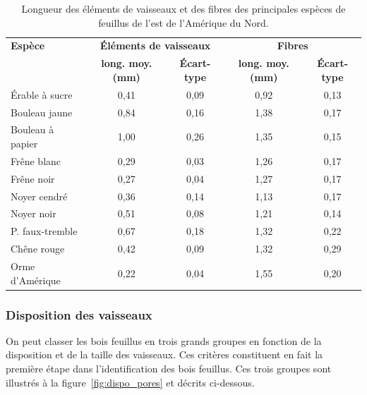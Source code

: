 \begin{table}[ht]
	\centering
	\begin{tabular}{l c c c c}
		\hline
		\bf Espèce & \multicolumn{2}{c}{\textbf{Éléments de vaisseaux}} & \multicolumn{2}{c}{\textbf{Fibres}}\\
		& \bf long. moy. (mm) & \bf Écart-type & \bf long. moy. (mm) & \bf Écart-type \\
		\hline
		\hline
		Érable à sucre	&	0,41	&	0,09	&	0,92	&	0,13	\\
		Bouleau jaune	&	0,84	&	0,16	&	1,38	&	0,17	\\
		Bouleau à papier	&	1,00	&	0,26	&	1,35	&	0,15	\\
		Frêne blanc	&	0,29	&	0,03	&	1,26	&	0,17	\\
		Frêne noir	&	0,27	&	0,04	&	1,27	&	0,17	\\
		Noyer cendré	&	0,36	&	0,14	&	1,13	&	0,17	\\
		Noyer noir	&	0,51	&	0,08	&	1,21	&	0,14	\\
		P. faux-tremble	&	0,67	&	0,18	&	1,32	&	0,22	\\
		Chêne rouge	&	0,42	&	0,09	&	1,32	&	0,29	\\
		Orme d’Amérique	&	0,22	&	0,04	&	1,55	&	0,20	\\
		\hline
	\end{tabular}
	\caption{Longueur des éléments de vaisseaux et des fibres des principales espèces de feuillus de l'est de l'Amérique du Nord.}\label{tab:long_vaiss}
\end{table}

\subsubsection{Disposition des vaisseaux}

On peut classer les bois feuillus en trois grands groupes en fonction de la disposition et de la taille des vaisseaux.  Ces critères constituent en fait la première étape dans l'identification des bois feuillus. Ces trois groupes sont illustrés à la figure~\ref{fig:dispo_pores} et décrits ci-dessous.

